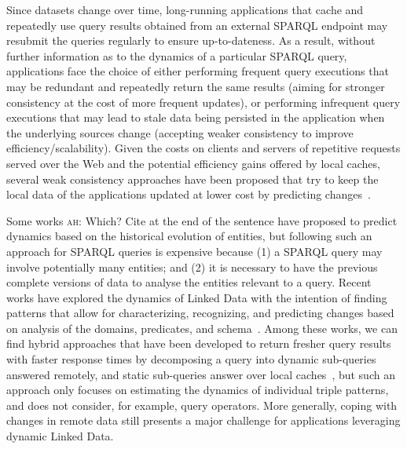 \documentclass[runningheads]{llncs}
\newcommand{\ah}[1]{{\color{blue}\textsc{ah:} #1}}
\begin{document}
Since datasets change over time, long-running applications that cache and repeatedly use query results obtained from an external SPARQL endpoint may resubmit the queries regularly to ensure up-to-dateness. As a result, without further information as to the dynamics of a particular SPARQL query, applications face the choice of either performing frequent query executions that may be redundant and repeatedly return the same results (aiming for stronger consistency at the cost of more frequent updates), or performing infrequent query executions that may lead to stale data being persisted in the application when the underlying sources change (accepting weaker consistency to improve efficiency/scalability). Given the costs on clients and servers of repetitive requests served over the Web  and the potential efficiency gains offered by local caches, several weak consistency approaches have been proposed that try to keep the local data of the applications updated at lower cost by predicting changes~\cite{KnuthHS16,DividinoGS15,NishiokaS17}.

Some works \ah{Which? Cite at the end of the sentence} have proposed to predict dynamics based on the historical evolution of entities, but following such an approach for SPARQL queries is expensive because (1) a SPARQL query may involve potentially many entities; and (2) it is necessary to have the previous complete versions of data to analyse the entities relevant to a query. Recent works have explored the dynamics of Linked Data with the intention of finding patterns that allow for characterizing, recognizing, and predicting changes based on analysis of the domains, predicates, and schema~\cite{UmbrichHHPD10,KaferAUOH13,NishiokaS16,NishiokaS17,GonzalezH18}. Among these works, we can find hybrid approaches that have been developed to return fresher query results with faster response times by decomposing a query into dynamic sub-queries answered remotely, and static sub-queries answer over local caches~\cite{UmbrichKHP12}, but such an approach only focuses on estimating the dynamics of individual triple patterns, and does not consider, for example, query operators. More generally, coping with changes in remote data still presents a major challenge for applications leveraging dynamic Linked Data.
\end{document}
